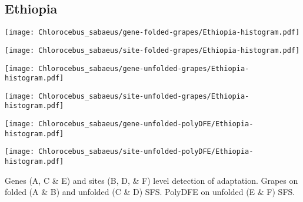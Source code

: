 \documentclass{article}
\begin{document}
\subsection{Ethiopia}
\centering
\begin{minipage}{0.49\linewidth}
    \texttt{[image: Chlorocebus\_sabaeus/gene-folded-grapes/Ethiopia-histogram.pdf]}
\end{minipage}%
\hfill
\begin{minipage}{0.49\linewidth}
    \texttt{[image: Chlorocebus\_sabaeus/site-folded-grapes/Ethiopia-histogram.pdf]}
\end{minipage}
\hfill
\begin{minipage}{0.49\linewidth}
    \texttt{[image: Chlorocebus\_sabaeus/gene-unfolded-grapes/Ethiopia-histogram.pdf]}
\end{minipage}%
\hfill
\begin{minipage}{0.49\linewidth}
    \texttt{[image: Chlorocebus\_sabaeus/site-unfolded-grapes/Ethiopia-histogram.pdf]}
\end{minipage}
\hfill
\begin{minipage}{0.49\linewidth}
    \texttt{[image: Chlorocebus\_sabaeus/gene-unfolded-polyDFE/Ethiopia-histogram.pdf]}
\end{minipage}%
\hfill
\begin{minipage}{0.49\linewidth}
    \texttt{[image: Chlorocebus\_sabaeus/site-unfolded-polyDFE/Ethiopia-histogram.pdf]}
\end{minipage}
\hfill
\flushleft
Genes (A, C \& E) and sites (B, D, \& F) level detection of adaptation.
Grapes on folded (A \& B) and unfolded (C \& D) SFS.
PolyDFE on unfolded (E \& F) SFS.

\pagebreak
\end{document}
